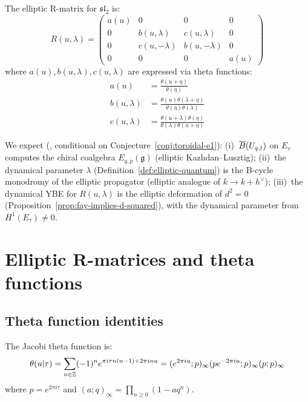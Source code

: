 \begin{definition}\label{def:elliptic-r}
The elliptic R-matrix for $\mathfrak{sl}_2$ is:
\[
R(u, \lambda) = \begin{pmatrix}
a(u) & 0 & 0 & 0 \\
0 & b(u, \lambda) & c(u, \lambda) & 0 \\
0 & c(u, -\lambda) & b(u, -\lambda) & 0 \\
0 & 0 & 0 & a(u)
\end{pmatrix}
\]
where $a(u), b(u, \lambda), c(u, \lambda)$ are expressed via theta functions:
\begin{align*}
a(u) &= \frac{\theta(u + \eta)}{\theta(\eta)} \\
b(u, \lambda) &= \frac{\theta(u)\theta(\lambda + \eta)}{\theta(\eta)\theta(\lambda)} \\
c(u, \lambda) &= \frac{\theta(u + \lambda)\theta(\eta)}{\theta(\lambda)\theta(u + \eta)}
\end{align*}
\end{definition}


\begin{remark}
\label{rem:elliptic-qg-bar}
We expect (\ClaimStatusConjectured, conditional on Conjecture~\ref{conj:toroidal-e1}):
(i)~$\overline{B}(U_{q,t})$ on $E_\tau$ computes the chiral coalgebra $E_{q,p}(\mathfrak{g})$ (elliptic Kazhdan--Lusztig);
(ii)~the dynamical parameter $\lambda$ (Definition~\ref{def:elliptic-quantum}) is the B-cycle monodromy of the elliptic propagator (elliptic analogue of $k \to k + h^\vee$);
(iii)~the dynamical YBE for $R(u,\lambda)$ is the elliptic deformation of $d^2 = 0$ (Proposition~\ref{prop:fay-implies-d-squared}), with the dynamical parameter from $H^1(E_\tau) \neq 0$.
\end{remark}

\section{Elliptic R-matrices and theta functions}
\label{sec:elliptic-r-theta}

\subsection{Theta function identities}

\begin{definition}\label{def:theta}
The Jacobi theta function is:
\[
\theta(u | \tau) = \sum_{n \in \mathbb{Z}} (-1)^n e^{\pi i \tau n(n-1) + 2\pi i n u} =
(e^{2\pi iu}; p)_\infty (p e^{-2\pi iu}; p)_\infty (p; p)_\infty
\]
where $p = e^{2\pi i \tau}$ and $(a; q)_\infty = \prod_{n \geq 0}(1 - aq^n)$.
\end{definition}

